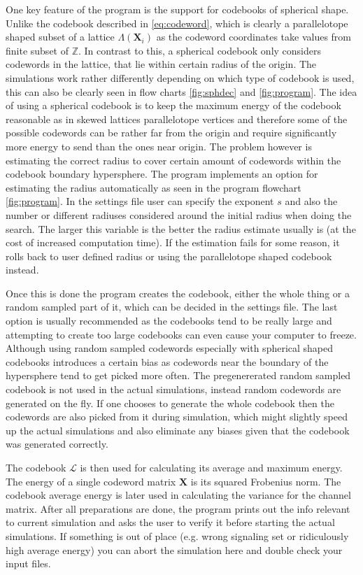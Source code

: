\documentclass[english,12pt,a4paper,pdftex,sci,utf8]{aaltothesis}
\begin{document}
\par One key feature of the program is the support for codebooks of spherical shape. Unlike the codebook described in \eqref{eq:codeword}, which is clearly a parallelotope shaped subset of a lattice $\Lambda(\textbf{X}_i)$ as the codeword coordinates take values from finite subset of $\mathbb{Z}$. In contrast to this, a spherical codebook only considers codewords in the lattice, that lie within certain radius of the origin. The simulations work rather differently depending on which type of codebook is used, this can also be clearly seen in flow charts \ref{fig:sphdec} and \ref{fig:program}. The idea of using a spherical codebook is to keep the maximum energy of the codebook reasonable as in skewed lattices parallelotope vertices and therefore some of the possible codewords can be rather far from the origin and require significantly more energy to send than the ones near origin. The problem however is estimating the correct radius to cover certain amount of codewords within the codebook boundary hypersphere. The program implements an option for estimating the radius automatically as seen in the program flowchart \ref{fig:program}. In the settings file user can specify the exponent $s$ and also the number or different radiuses considered around the initial radius when doing the search. The larger this variable is the better the radius estimate usually is (at the cost of increased computation time). If the estimation fails for some reason, it rolls back to user defined radius or using the parallelotope shaped codebook instead.
\par Once this is done the program creates the codebook, either the whole thing or a random sampled part of it, which can be decided in the settings file. The last option is usually recommended as the codebooks tend to be really large and attempting to create too large codebooks can even cause your computer to freeze. Although using random sampled codewords especially with spherical shaped codebooks introduces a certain bias as codewords near the boundary of the hypersphere tend to get picked more often. The pregenererated random sampled codebook is not used in the actual simulations, instead random codewords are generated on the fly. If one chooses to generate the whole codebook then the codewords are also picked from it during simulation, which might slightly speed up the actual simulations and also eliminate any biases given that the codebook was generated correctly. 
\par The codebook $\mathcal{L}$ is then used for calculating its average and maximum energy. The energy of a single codeword matrix $\mathbf{X}$ is its squared Frobenius norm. The codebook average energy is later used in calculating the variance for the channel matrix. After all preparations are done, the program prints out the info relevant to current simulation and asks the user to verify it before starting the actual simulations. If something is out of place (e.g. wrong signaling set or ridiculously high average energy) you can abort the simulation here and double check your input files.
\end{document}
